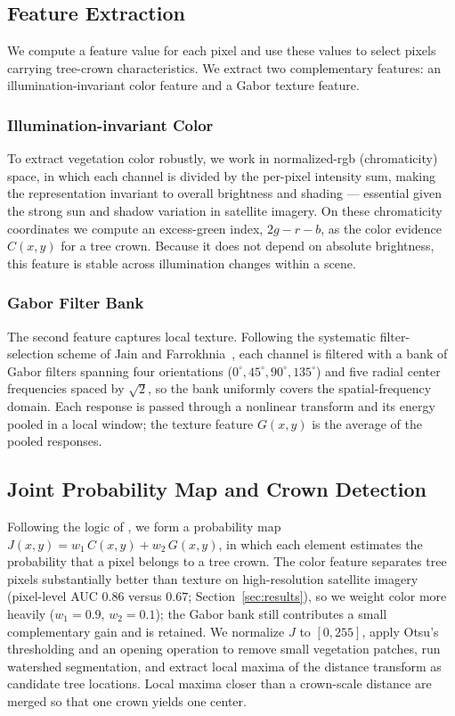 \documentclass{article}
\begin{document}
\subsection{Feature Extraction}

We compute a feature value for each pixel and use these values to select pixels carrying tree-crown characteristics. We extract two complementary features: an illumination-invariant color feature and a Gabor texture feature.

\subsubsection{Illumination-invariant Color}

To extract vegetation color robustly, we work in normalized-rgb (chromaticity) space, in which each channel is divided by the per-pixel intensity sum, making the representation invariant to overall brightness and shading --- essential given the strong sun and shadow variation in satellite imagery. On these chromaticity coordinates we compute an excess-green index, $2g - r - b$, as the color evidence $C(x,y)$ for a tree crown. Because it does not depend on absolute brightness, this feature is stable across illumination changes within a scene.

\subsubsection{Gabor Filter Bank}

The second feature captures local texture. Following the systematic filter-selection scheme of Jain and Farrokhnia~\cite{JAIN19911167}, each channel is filtered with a bank of Gabor filters spanning four orientations ($0^\circ, 45^\circ, 90^\circ, 135^\circ$) and five radial center frequencies spaced by $\sqrt{2}$, so the bank uniformly covers the spatial-frequency domain. Each response is passed through a nonlinear transform and its energy pooled in a local window; the texture feature $G(x,y)$ is the average of the pooled responses.

\subsection{Joint Probability Map and Crown Detection}

Following the logic of \cite{ozcan_abdullah}, we form a probability map $J(x,y) = w_1 \, C(x,y) + w_2 \, G(x,y)$, in which each element estimates the probability that a pixel belongs to a tree crown. The color feature separates tree pixels substantially better than texture on high-resolution satellite imagery (pixel-level AUC $0.86$ versus $0.67$; Section~\ref{sec:results}), so we weight color more heavily ($w_1=0.9$, $w_2=0.1$); the Gabor bank still contributes a small complementary gain and is retained. We normalize $J$ to $[0,255]$, apply Otsu's thresholding and an opening operation to remove small vegetation patches, run watershed segmentation, and extract local maxima of the distance transform as candidate tree locations. Local maxima closer than a crown-scale distance are merged so that one crown yields one center.
\end{document}
